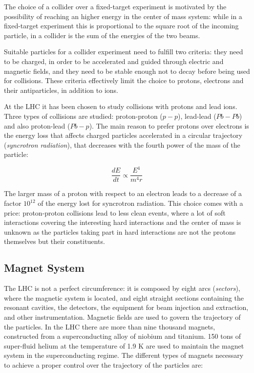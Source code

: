 The choice of a collider over a fixed-target experiment is motivated by the possibility of reaching an higher energy in the center of mass system: while in a fixed-target experiment this is proportional to the square root of the incoming particle, in a collider is the sum of the energies of the two beams.


Suitable particles for a collider experiment need to fulfill two criteria: they need to be charged, in order to be accelerated and guided through electric and magnetic fields, and they need to be stable enough not to decay before being used for collisions. These criteria effectively limit the choice to protons, electrons and their antiparticles, in addition to ions. 

At the LHC it has been chosen to study collisions with protons and lead ions. Three types of collisions are studied: proton-proton ($p-p$), lead-lead ($Pb-Pb$) and also proton-lead ($Pb-p$). The main reason to prefer protons over electrons is the energy loss that affects charged particles accelerated in a circular trajectory (\textit{syncrotron radiation}), that decreases with the fourth power of the mass of the particle:

\begin{equation}
\label{eq:cern:sync}
\frac{dE}{dt} \propto \frac{E^4}{m^4 r}
\end{equation}

The larger mass of a proton with respect to an electron leads to a decrease of a factor $10^{12}$ of the energy lost for syncrotron radiation. This choice comes with a price: proton-proton collisions lead to less clean events, where a lot of soft interactions covering the interesting hard interactions and the center of mass is unknown as the particles taking part in hard interactions are not the protons themselves but their constituents.

\subsection{Magnet System} 


The LHC is not a perfect circumference: it is composed by eight arcs (\textit{sectors}), where the magnetic system is located, and eight straight sections containing the resonant cavities, the detectors, the equipment for beam injection and extraction, and other instrumentation. Magnetic fields are used to govern the trajectory of the particles. In the LHC there are more than nine thousand magnets, constructed from a superconducting alloy of niobium and titanium. 150 tons of super-fluid helium at the temperature of 1.9 K are used to maintain the magnet system in the superconducting regime. The different types of magnets necessary to achieve a proper control over the trajectory of the particles are:

